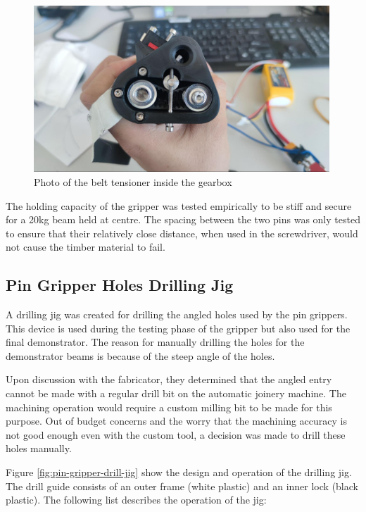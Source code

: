 \begin{figure}[!h]
    \centering
    \includegraphics[width=0.99\textwidth]{images/7a/img47.jpg}
    \caption{Photo of the belt tensioner inside the gearbox}
    \label{fig:belt-tensioner-inside-the-gearbox}
\end{figure}

The holding capacity of the gripper was tested empirically to be stiff and secure for a 20kg beam held at centre. The spacing between the two pins was only tested to ensure that their relatively close distance, when used in the screwdriver, would not cause the timber material to fail. 

\FloatBarrier

\subsection{Pin Gripper Holes Drilling Jig}
\label{subsection:exploration-4-pin-gripper-holes-drilling-jig}

A drilling jig was created for drilling the angled holes used by the pin grippers. This device is used during the testing phase of the gripper but also used for the final demonstrator. The reason for manually drilling the holes for the demonstrator beams is because of the steep angle of the holes. 

Upon discussion with the fabricator, they determined that the angled entry cannot be made with a regular drill bit on the automatic joinery machine. The machining operation would require a custom milling bit to be made for this purpose. Out of budget concerns and the worry that the machining accuracy is not good enough even with the custom tool, a decision was made to drill these holes manually.

Figure \ref{fig:pin-gripper-drill-jig} show the design and operation of the drilling jig. The drill guide consists of an outer frame (white plastic) and an inner lock (black plastic). The following list describes the operation of the jig:


